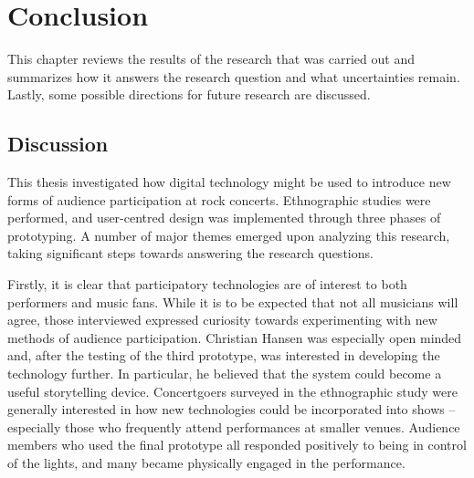 \chapter{Conclusion}

This chapter reviews the results of the research that was carried out and summarizes how it answers the research question and what uncertainties remain. Lastly, some possible directions for future research are discussed.

\section{Discussion}

This thesis investigated how digital technology might be used to introduce new forms of audience participation at rock concerts. Ethnographic studies were performed, and user-centred design was implemented through three phases of prototyping. A number of major themes emerged upon analyzing this research, taking significant steps towards answering the research questions.



Firstly, it is clear that participatory technologies are of interest to both performers and music fans. While it is to be expected that not all musicians will agree, those interviewed expressed curiosity towards experimenting with new methods of audience participation. Christian Hansen was especially open minded and, after the testing of the third prototype, was interested in developing the technology further. In particular, he believed that the system could become a useful storytelling device. Concertgoers surveyed in the ethnographic study were generally interested in how new technologies could be incorporated into shows -- especially those who frequently attend performances at smaller venues. Audience members who used the final prototype all responded positively to being in control of the lights, and many became physically engaged in the performance.

